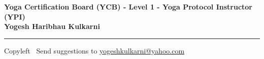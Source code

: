 
\usepackage{polyglossia}
\setdefaultlanguage{sanskrit}

\usepackage{fontspec}
\setmainfont{Segoe UI}
\newfontfamily{}
\newfontfamily{}


\graphicspath{{images/}}


\footnotesize



\begin{center}
\Large{\textbf{Yoga Certification Board (YCB) - Level 1 - Yoga Protocol Instructor (YPI)\\ Yogesh Haribhau Kulkarni}}  
\end{center}

\begin{multicols}{2}

\end{multicols}

\rule{\linewidth}{0.25pt}
\scriptsize
Copyleft \textcopyleft\  Send suggestions to 
\href{http://www.yogeshkulkarni.com}{yogeshkulkarni@yahoo.com}




